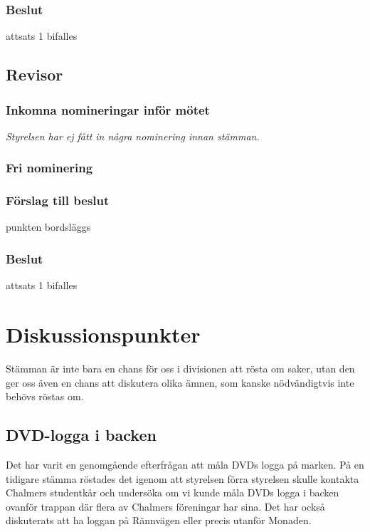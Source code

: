 \documentclass[protokoll]{dvd}
\begin{document}
\subsubsection*{Beslut}
\begin{attsatser}
    \item attsats 1 bifalles
\end{attsatser}

\subsection*{Revisor}
\subsubsection*{Inkomna nomineringar inför mötet}
\textit{Styrelsen har ej fått in några nominering innan stämman.}
\subsubsection*{Fri nominering}
\subsubsection*{Förslag till beslut}
\begin{attsatser}
    \item punkten bordsläggs
\end{attsatser}
\subsubsection*{Beslut}
\begin{attsatser}
    \item attsats 1 bifalles
\end{attsatser}

\section{Diskussionspunkter}
Stämman är inte bara en chans för oss i divisionen att rösta om saker, utan den ger oss även en chans att diskutera olika ämnen, som kanske nödvändigtvis inte behövs röstas om.
\\

\subsection*{DVD-logga i backen}
Det har varit en genomgående efterfrågan att måla DVDs logga på marken. På en tidigare stämma röstades det igenom att styrelsen förra styrelsen skulle kontakta Chalmers studentkår och undersöka om vi kunde måla DVDs logga i backen ovanför trappan där flera av Chalmers föreningar har sina. Det har också diskuterats att ha loggan på Rännvägen eller precis utanför Monaden. 
\end{document}
